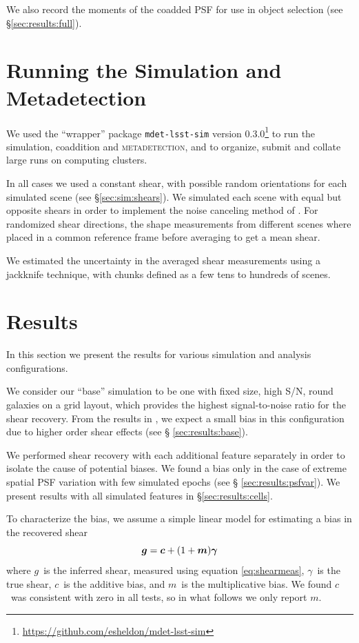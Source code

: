 \documentclass[iop, twocolappendix, appendixfloats, numberedappendix, apj]{hackemulateapj}
\newcommand{\vecg}{\mbox{\boldmath $g$}}
\newcommand{\vecc}{\mbox{\boldmath $c$}}
\newcommand{\vecm}{\mbox{\boldmath $m$}}
\newcommand{\mdet}{\textsc{metadetection}}
\newcommand{\vecgam}{\mbox{\boldmath $\gamma$}}
\begin{document}
We also record the moments of the coadded PSF for use in object selection (see
\S \ref{sec:results:full}).


\section{Running the Simulation and Metadetection} \label{sec:running}

We used the ``wrapper'' package \texttt{mdet-lsst-sim} version
0.3.0\footnote{\url{https://github.com/esheldon/mdet-lsst-sim}} to run the
simulation, coaddition and \mdet, and to organize, submit and collate large
runs on computing clusters.

In all cases we used a constant shear, with possible random orientations for
each simulated scene (see \S \ref{sec:sim:shears}).  We simulated each scene
with equal but opposite shears in order to implement the noise canceling method
of \citep{pujol2019}.  For randomized shear directions, the shape measurements
from different scenes where placed in a common reference frame before averaging
to get a mean shear.

We estimated the uncertainty in the averaged shear measurements using a
jackknife technique, with chunks defined as a few tens to hundreds of scenes.

\section{Results} \label{sec:results}

In this section we present the results for various simulation and analysis
configurations.

We consider our ``base'' simulation to be one with fixed size, high S/N, round
galaxies on a grid layout, which provides the highest signal-to-noise ratio for
the shear recovery. From the results in \citet{mdet20}, we expect a small bias
in this configuration due to higher order shear effects (see \S
\ref{sec:results:base}).

We performed shear recovery with each additional feature separately in order to
isolate the cause of potential biases.  We found a bias only in the case of
extreme spatial PSF variation with few simulated epochs (see \S
\ref{sec:results:psfvar}).  We present results with all simulated features in
\S \ref{sec:results:cells}.

To characterize the bias, we assume a simple linear model \citep[see,
e.g.,][]{heymans2006} for estimating a bias in the recovered shear
\begin{equation} \label{eq:m}
\vecg = \vecc + (1 + \vecm) \vecgam
\end{equation}
where \vecg\ is the inferred shear, measured using equation \ref{eq:shearmeas},
\vecgam\ is the true shear, \vecc\ is the additive bias, and \vecm\ is the
multiplicative bias. We found \vecc\ was consistent with zero in all tests, so
in what follows we only report \vecm.
\end{document}
